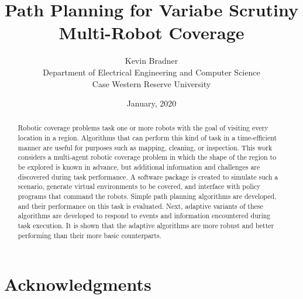 \title{Path Planning for Variabe Scrutiny Multi-Robot Coverage}

\author{Kevin Bradner\\Department of Electrical Engineering and Computer Science\\Case Western Reserve University}
\date{January, 2020}
\maketitle

\tableofcontents

\listoftables

\listoffigures

\section*{Acknowledgments}

\begin{abstract}
Robotic coverage problems task one or more robots with the goal of visiting every location in a region. Algorithms that can perform this kind of task in a time-efficient manner are useful for purposes such as mapping, cleaning, or inspection. This work considers a multi-agent robotic coverage problem in which the shape of the region to be explored is known in advance, but additional information and challenges are discovered during task performance. A software package is created to simulate such a scenario, generate virtual environments to be covered, and interface with policy programs that command the robots. Simple path planning algorithms are developed, and their performance on this task is evaluated. Next, adaptive variants of these algorithms are developed to respond to events and information encountered during task execution. It is shown that the adaptive algorithms are more robust and better performing than their more basic counterparts.
\end{abstract}